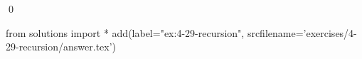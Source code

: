 
\begin{ex}
  \label{ex:4-29-recursion}
  
  \qed
\end{ex}
\begin{python0}
from solutions import *
add(label="ex:4-29-recursion",
    srcfilename='exercises/4-29-recursion/answer.tex')
\end{python0}
